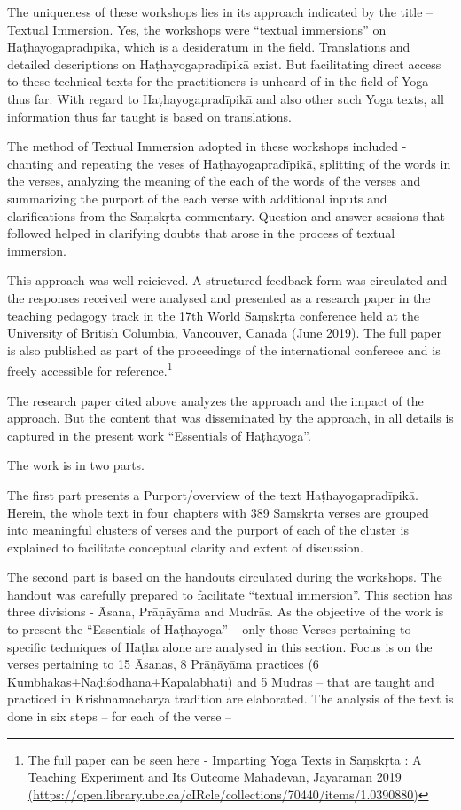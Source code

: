The uniqueness of these workshops lies in its approach indicated by the title – Textual Immersion. Yes, the workshops were “textual immersions” on Haṭhayogapradīpikā, which is a desideratum in the field. Translations and detailed descriptions on Haṭhayogapradīpikā exist. But facilitating direct access to these technical texts for the practitioners is unheard of in the field of Yoga thus far. With regard to Haṭhayogapradīpikā and also other such Yoga texts, all information thus far taught is based on translations.
\smallskip

The method of Textual Immersion adopted in these workshops included - chanting and repeating the veses of Haṭhayogapradīpikā, splitting of the words in the verses, analyzing the meaning of the each of the words of the verses and summarizing the purport of the each verse with additional inputs and clarifications from the Saṃskṛta commentary. Question and answer sessions that followed helped in clarifying doubts that arose in the process of textual immersion.
\smallskip

This approach was well reicieved. A structured feedback form was circulated and the responses received were  analysed and presented as a research paper in the teaching pedagogy track in the 17th World Saṃskṛta conference held at the University of British Columbia, Vancouver, Canāda (June 2019). The full paper is also published as part of the proceedings of the international conferece and is freely accessible for reference.\footnote{The full paper can be seen here - Imparting Yoga Texts in Saṃskṛta : A Teaching Experiment and Its Outcome Mahadevan, Jayaraman 2019 \url{(https://open.library.ubc.ca/cIRcle/collections/70440/items/1.0390880)}}
\smallskip

The research paper cited above analyzes the approach and the impact of the approach. But the content that was disseminated by the approach, in all details is captured in the present work “Essentials of Haṭhayoga”.

The work is in two parts.

The first part presents a Purport/overview of the text Haṭha\-yoga\-pra\-dīpikā. Herein, the whole text in four chapters with 389 Saṃskṛta verses are grouped into meaningful clusters of verses and the purport of each of the cluster is explained to facilitate conceptual clarity and extent of discussion.

The second part is based on the handouts circulated during the workshops. The handout was carefully prepared to facilitate “textual immersion”. This section has three divisions - Āsana, Prāṇāyāma and Mudrās. As the objective of the work is to present the “Essentials of Haṭhayoga” – only those Verses pertaining to specific techniques of Haṭha alone are analysed in this section. Focus is on the verses pertaining to 15 Āsanas, 8 Prāṇāyāma practices (6 Kumbhakas+Nāḍīśodhana+Kapālabhāti) and 5 Mudrās – that are taught and practiced in Krishnamacharya tradition are elaborated. The analysis of the text is done in six steps – for each of the verse – 

